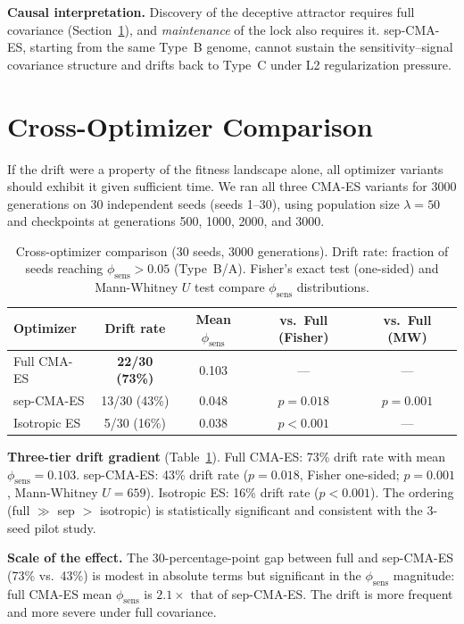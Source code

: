 \documentclass[twoside,11pt]{article}
\begin{document}
\textbf{Causal interpretation.} Discovery of the deceptive attractor requires
full covariance (Section~\ref{sec:crossopt}), and \emph{maintenance} of the
lock also requires it. sep-CMA-ES, starting from the same Type~B genome,
cannot sustain the sensitivity--signal covariance structure and drifts back
to Type~C under L2 regularization pressure.

\section{Cross-Optimizer Comparison}
\label{sec:crossopt}

If the drift were a property of the fitness landscape alone, all optimizer
variants should exhibit it given sufficient time. We ran all three CMA-ES
variants for 3000 generations on 30 independent seeds (seeds 1--30),
using population size $\lambda = 50$ and checkpoints at generations
500, 1000, 2000, and 3000.

\begin{table}[t]
\caption{Cross-optimizer comparison (30 seeds, 3000 generations).
Drift rate: fraction of seeds reaching $\phi_{\text{sens}} > 0.05$ (Type~B/A).
Fisher's exact test (one-sided) and Mann-Whitney $U$ test compare
$\phi_{\text{sens}}$ distributions.}
\label{tab:crossopt}
\centering
\begin{tabular}{lcccc}
\toprule
Optimizer & Drift rate & Mean $\phi_{\text{sens}}$ & vs.\ Full (Fisher) & vs.\ Full (MW) \\
\midrule
Full CMA-ES & \textbf{22/30 (73\%)} & 0.103 & --- & --- \\
sep-CMA-ES & 13/30 (43\%) & 0.048 & $p = 0.018$ & $p = 0.001$ \\
Isotropic ES & 5/30 (16\%) & 0.038 & $p < 0.001$ & --- \\
\bottomrule
\end{tabular}
\end{table}

\textbf{Three-tier drift gradient} (Table~\ref{tab:crossopt}).
Full CMA-ES: 73\% drift rate with mean $\phi_{\text{sens}} = 0.103$.
sep-CMA-ES: 43\% drift rate ($p = 0.018$, Fisher one-sided; $p = 0.001$,
Mann-Whitney $U = 659$). Isotropic ES: 16\% drift rate ($p < 0.001$).
The ordering (full $\gg$ sep $>$ isotropic) is statistically
significant and consistent with the 3-seed pilot study.

\textbf{Scale of the effect.} The 30-percentage-point gap between full and
sep-CMA-ES (73\% vs.\ 43\%) is modest in absolute terms but significant
in the $\phi_{\text{sens}}$ magnitude: full CMA-ES mean $\phi_{\text{sens}}$
is $2.1\times$ that of sep-CMA-ES. The drift is more frequent and more severe under full covariance.
\end{document}
